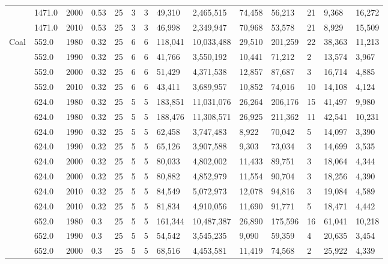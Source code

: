 \begin{table}[]
\begin{tabular}{|l|l|l|l|l|l|l|l|l|l|l|l|l|l|}
		& 1471.0 & 2000 & 0.53 & 25 & 3 & 3 & 49,310 & 2,465,515 & 74,458 & 56,213 & 21 & 9,368 & 16,272 \\ \cline{2-14} 
		& 1471.0 & 2010 & 0.53 & 25 & 3 & 3 & 46,998 & 2,349,947 & 70,968 & 53,578 & 21 & 8,929 & 15,509 \\ \hline
		\multirow{24}{*}{Coal} & 552.0 & 1980 & 0.32 & 25 & 6 & 6 & 118,041 & 10,033,488 & 29,510 & 201,259 & 22 & 38,363 & 11,213 \\ \cline{2-14} 
		& 552.0 & 1990 & 0.32 & 25 & 6 & 6 & 41,766 & 3,550,192 & 10,441 & 71,212 & 2 & 13,574 & 3,967 \\ \cline{2-14} 
		& 552.0 & 2000 & 0.32 & 25 & 6 & 6 & 51,429 & 4,371,538 & 12,857 & 87,687 & 3 & 16,714 & 4,885 \\ \cline{2-14} 
		& 552.0 & 2010 & 0.32 & 25 & 6 & 6 & 43,411 & 3,689,957 & 10,852 & 74,016 & 10 & 14,108 & 4,124 \\ \cline{2-14} 
		& 624.0 & 1980 & 0.32 & 25 & 5 & 5 & 183,851 & 11,031,076 & 26,264 & 206,176 & 15 & 41,497 & 9,980 \\ \cline{2-14} 
		& 624.0 & 1980 & 0.32 & 25 & 5 & 5 & 188,476 & 11,308,571 & 26,925 & 211,362 & 11 & 42,541 & 10,231 \\ \cline{2-14} 
		& 624.0 & 1990 & 0.32 & 25 & 5 & 5 & 62,458 & 3,747,483 & 8,922 & 70,042 & 5 & 14,097 & 3,390 \\ \cline{2-14} 
		& 624.0 & 1990 & 0.32 & 25 & 5 & 5 & 65,126 & 3,907,588 & 9,303 & 73,034 & 3 & 14,699 & 3,535 \\ \cline{2-14} 
		& 624.0 & 2000 & 0.32 & 25 & 5 & 5 & 80,033 & 4,802,002 & 11,433 & 89,751 & 3 & 18,064 & 4,344 \\ \cline{2-14} 
		& 624.0 & 2000 & 0.32 & 25 & 5 & 5 & 80,882 & 4,852,979 & 11,554 & 90,704 & 3 & 18,256 & 4,390 \\ \cline{2-14} 
		& 624.0 & 2010 & 0.32 & 25 & 5 & 5 & 84,549 & 5,072,973 & 12,078 & 94,816 & 3 & 19,084 & 4,589 \\ \cline{2-14} 
		& 624.0 & 2010 & 0.32 & 25 & 5 & 5 & 81,834 & 4,910,056 & 11,690 & 91,771 & 5 & 18,471 & 4,442 \\ \cline{2-14} 
		& 652.0 & 1980 & 0.3 & 25 & 5 & 5 & 161,344 & 10,487,387 & 26,890 & 175,596 & 16 & 61,041 & 10,218 \\ \cline{2-14} 
		& 652.0 & 1990 & 0.3 & 25 & 5 & 5 & 54,542 & 3,545,235 & 9,090 & 59,359 & 4 & 20,635 & 3,454 \\ \cline{2-14} 
		& 652.0 & 2000 & 0.3 & 25 & 5 & 5 & 68,516 & 4,453,581 & 11,419 & 74,568 & 2 & 25,922 & 4,339 \\ \cline{2-14} 

\end{tabular}
\end{table}
